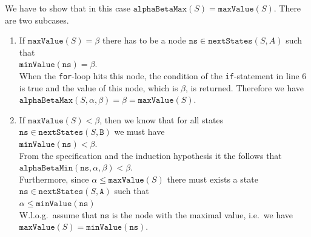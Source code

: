 \begin{enumerate}
\begin{enumerate}[(a)]
        We have to show that in this case $\mathtt{alphaBetaMax}(S) = \mathtt{maxValue}(S)$.
        There are two subcases.
        \begin{enumerate}
        \item If $\texttt{maxValue}(S) = \beta$ there has to be a node $\texttt{ns} \in \texttt{nextStates}(S,
          A)$ such that
              \\[0.2cm]
              \hspace*{1.3cm}
              $\texttt{minValue}(\mathtt{ns}) = \beta$.
              \\[0.2cm]
              When the \texttt{for}-loop hits this node, the
              condition of the \texttt{if}-statement in line 6 is true and the value of this node,
              which is $\beta$, is returned.   Therefore we have
              \\[0.2cm]
              \hspace*{1.3cm}
              $\texttt{alphaBetaMax}(S, \alpha, \beta) = \beta = \texttt{maxValue}(S)$.
        \item If $\texttt{maxValue}(S) < \beta$, then we know that for all states
              $\texttt{ns} \in \mathtt{nextStates}(S, \mathtt{B})$ we must have 
              \\[0.2cm]
              \hspace*{1.3cm}
              $\texttt{minValue}(\mathtt{ns}) < \beta$.              
              \\[0.2cm]
              From the specification and the induction hypothesis it the follows that
              \\[0.2cm]
              \hspace*{1.3cm}
              $\texttt{alphaBetaMin}(\mathtt{ns}, \alpha, \beta) < \beta$.              
              \\[0.2cm]
              Furthermore, since $\alpha \leq \mathtt{maxValue}(S)$ there must exists a state
              $\texttt{ns} \in \mathtt{nextStates}(S, \mathtt{A})$ such that
              \\[0.2cm]
              \hspace*{1.3cm}
              $\alpha \leq \mathtt{minValue}(\mathtt{ns})$
              \\[0.2cm]
              W.l.o.g.~assume that $\mathtt{ns}$ is the node with the maximal value, i.e.~we have
              \\[0.2cm]
              \hspace*{1.3cm}
              $\texttt{maxValue}(S) = \texttt{minValue}(\texttt{ns})$.

\end{enumerate}
\end{enumerate}
\end{enumerate}
